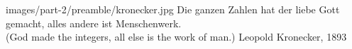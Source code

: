 {images/part-2/preamble/kronecker.jpg}
{
    Die ganzen Zahlen hat der liebe Gott gemacht, alles andere ist Menschenwerk.\\
    \textnormal{(God made the integers, all else is the work of man.)}
}
{Leopold Kronecker, 1893}
{\cite[p.~15]{weber_1893}}
